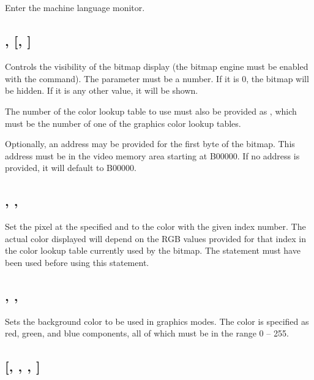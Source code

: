 \documentclass{report}
\begin{document}
    \subsection*{}

    Enter the machine language monitor.

    \subsection*{ ,  [, ]}

    Controls the visibility of the bitmap display (the bitmap engine must be
    enabled with the  command). The parameter 
    must be a number. If it is 0, the bitmap will be hidden. If it is any other
    value, it will be shown.

    The number of the color lookup table to use must also be provided as ,
    which must be the number of one of the graphics color lookup tables.

    Optionally, an address may be provided for the first byte of the bitmap.
    This address must be in the video memory area starting at B00000.
    If no address is provided, it will default to B00000.

    \subsection*{ , , }

    Set the pixel at the specified  and  to the
    color with the given  index number.
    The actual color displayed will depend on the RGB values provided for
    that index in the color lookup table currently used by the bitmap.
    The  statement must have been used before using
    this statement.

    \subsection*{ , , }

    Sets the background color to be used in graphics modes.
    The color is specified as red, green, and blue components,
    all of which must be in the range 0 -- 255.

    \subsection*{  [, , ,  ]}
\end{document}
